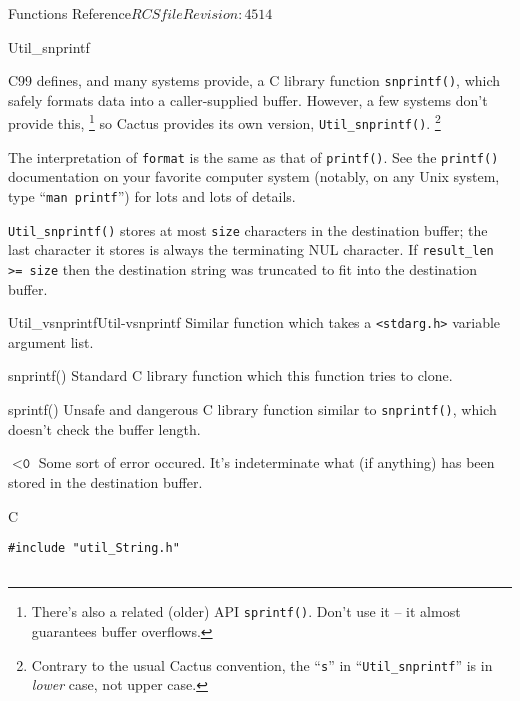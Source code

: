 \begin{cactuspart}{ Functions Reference}{$RCSfile$}{$Revision: 4514 $}
\begin{FunctionDescription}{Util\_snprintf}
\begin{Discussion}
C99 defines, and many systems provide, a C library function \verb|snprintf()|,
which safely formats data into a caller-supplied buffer.  However, a few
systems don't provide this,%
\footnote{%
	 There's also a related (older) API \texttt{sprintf()}.
	 Don't use it -- it almost guarantees buffer
	 overflows.
	 }%
{} so Cactus provides its own version, \verb|Util_snprintf()|.%
\footnote{%
	 Contrary to the usual Cactus convention, the
	 ``\texttt{s}'' in ``\texttt{Util\_snprintf}''
	 is in \emph{lower} case, not upper case.
	 }%

The interpretation of \verb|format| is the same as that of \verb|printf()|.
See the \verb|printf()| documentation on your favorite computer system
(notably, on any Unix system, type ``\verb|man printf|'') for lots and lots
of details.

\verb|Util_snprintf()| stores at most \verb|size| characters
in the destination buffer; the last character it stores is always
the terminating NUL character.  If \verb|result_len >= size| then
the destination string was truncated to fit into the destination buffer.
\end{Discussion}

\begin{SeeAlsoSection}
\begin{SeeAlso2}{Util\_vsnprintf}{Util-vsnprintf}
Similar function which takes a \verb|<stdarg.h>| variable argument list.
\end{SeeAlso2}
\begin{SeeAlso}{snprintf()}
Standard C library function which this function tries to clone.
\end{SeeAlso}
\begin{SeeAlso}{sprintf()}
Unsafe and dangerous C library function similar to \verb|snprintf()|,
which doesn't check the buffer length.
\end{SeeAlso}
\end{SeeAlsoSection}

\begin{ErrorSection}
\begin{Error}{$< \texttt{0}$}
Some sort of error occured.  It's indeterminate what (if anything)
has been stored in the destination buffer.
\end{Error}
\end{ErrorSection}

\begin{ExampleSection}
\begin{Example}{C}
\begin{verbatim}
#include "util_String.h"


\end{verbatim}
\end{Example}
\end{ExampleSection}
\end{FunctionDescription}
\end{cactuspart}
